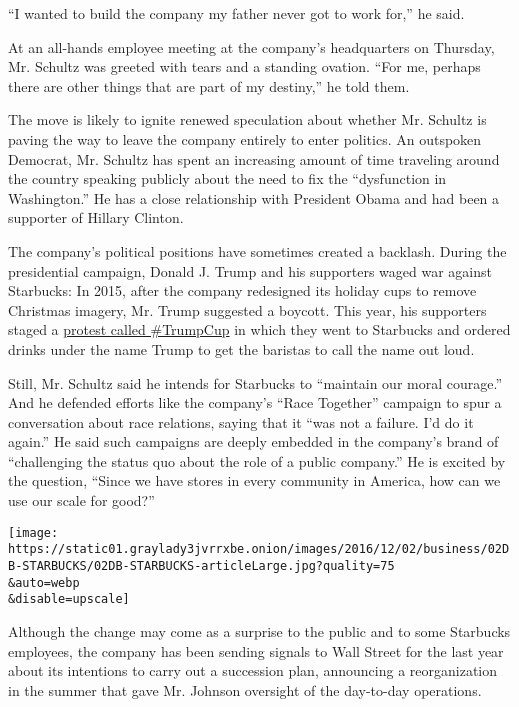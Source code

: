 ``I wanted to build the company my father never got to work for,'' he
said.

At an all-hands employee meeting at the company's headquarters on
Thursday, Mr. Schultz was greeted with tears and a standing ovation.
``For me, perhaps there are other things that are part of my destiny,''
he told them.

The move is likely to ignite renewed speculation about whether Mr.
Schultz is paving the way to leave the company entirely to enter
politics. An outspoken Democrat, Mr. Schultz has spent an increasing
amount of time traveling around the country speaking publicly about the
need to fix the ``dysfunction in Washington.'' He has a close
relationship with President Obama and had been a supporter of Hillary
Clinton.

The company's political positions have sometimes created a backlash.
During the presidential campaign, Donald J. Trump and his supporters
waged war against Starbucks: In 2015, after the company redesigned its
holiday cups to remove Christmas imagery, Mr. Trump suggested a boycott.
This year, his supporters staged a
\href{https://www.washingtonpost.com/news/post-nation/wp/2016/11/21/a-starbucks-barista-refused-to-write-trump-on-a-cup-how-his-supporters-are-striking-back/?utm_term=.a361e7a20659}{protest
called \#TrumpCup} in which they went to Starbucks and ordered drinks
under the name Trump to get the baristas to call the name out loud.

Still, Mr. Schultz said he intends for Starbucks to ``maintain our moral
courage.'' And he defended efforts like the company's ``Race Together''
campaign to spur a conversation about race relations, saying that it
``was not a failure. I'd do it again.'' He said such campaigns are
deeply embedded in the company's brand of ``challenging the status quo
about the role of a public company.'' He is excited by the question,
``Since we have stores in every community in America, how can we use our
scale for good?''

\texttt{[image: https://static01.graylady3jvrrxbe.onion/images/2016/12/02/business/02DB-STARBUCKS/02DB-STARBUCKS-articleLarge.jpg?quality=75\\\&auto=webp\\\&disable=upscale]}

Although the change may come as a surprise to the public and to some
Starbucks employees, the company has been sending signals to Wall Street
for the last year about its intentions to carry out a succession plan,
announcing a reorganization in the summer that gave Mr. Johnson
oversight of the day-to-day operations.

